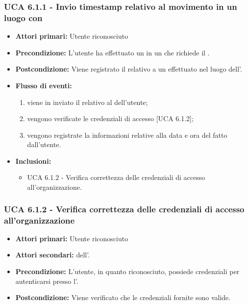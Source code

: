 \subsubsection{UCA 6.1.1 - Invio timestamp relativo al movimento in un luogo con }
\begin{itemize}
	\item \textbf{Attori primari:} Utente riconosciuto
	\item \textbf{Precondizione:} L'utente ha effettuato un  in un  che richiede il .
	\item \textbf{Postcondizione:} Viene registrato il  relativo a un  effettuato nel luogo dell'.
	\item \textbf{Flusso di eventi:}
		\begin{enumerate}
			\item viene in inviato il  relativo al  dell'utente;
			\item vengono verificate le credenziali di accesso [UCA 6.1.2];
			\item vengono registrate la informazioni relative alla data e ora del  fatto dall'utente.
		\end{enumerate}
	\item \textbf{Inclusioni:}
		\begin{itemize}
			\item UCA 6.1.2 - Verifica correttezza delle credenziali di accesso all'organizzazione.
		\end{itemize}
\end{itemize}

\subsubsection{UCA 6.1.2 - Verifica correttezza delle credenziali di accesso all'organizzazione}
\begin{itemize}
	\item \textbf{Attori primari:} Utente riconosciuto
	\item \textbf{Attori secondari:}  dell'.
	\item \textbf{Precondizione:} L'utente, in quanto riconosciuto, possiede credenziali per autenticarsi presso l'.
	\item \textbf{Postcondizione:} Viene verificato che le credenziali fornite sono valide.
\end{itemize}

